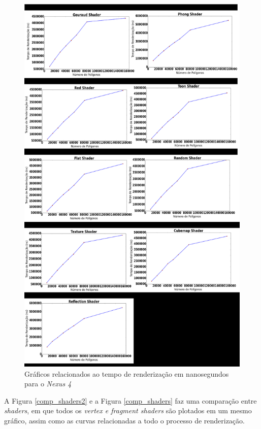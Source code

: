 	\begin{figure}[ht]
	\centering
		\includegraphics[keepaspectratio=true,scale=0.35]{figuras/render_time_pt.png}
	\caption{Gráficos relacionados ao tempo de renderização em nanosegundos para o \textit{Nexus 4}}
	\label{nexus3}
	\end{figure}	

	 A Figura \ref{comp_shaders2} e a Figura \ref{comp_shaders} faz uma comparação entre \textit{shaders}, em que todos os \textit{vertex e fragment shaders} são plotados em um mesmo gráfico, assim como as curvas relacionadas a todo o processo de renderização.	

